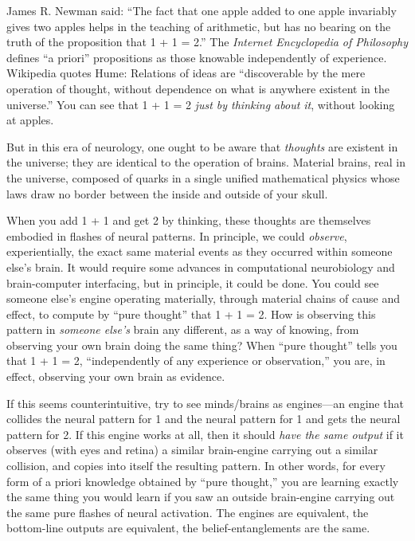 {
 James R. Newman said: ``The fact that one apple
added to one apple invariably gives two apples helps in the teaching of
arithmetic, but has no bearing on the truth of the proposition that 1 +
1 = 2.'' The \textit{Internet Encyclopedia of
Philosophy} defines ``a priori''
propositions as those knowable independently of experience. Wikipedia
quotes Hume: Relations of ideas are ``discoverable by
the mere operation of thought, without dependence on what is anywhere
existent in the universe.'' You can see that 1 + 1 =
2 \textit{just by thinking about it}, without looking at apples.}

{
 But in this era of neurology, one ought to be aware that
\textit{thoughts} are existent in the universe; they are identical to
the operation of brains. Material brains, real in the universe,
composed of quarks in a single unified mathematical physics whose laws
draw no border between the inside and outside of your skull.}

{
 When you add 1 + 1 and get 2 by thinking, these thoughts are
themselves embodied in flashes of neural patterns. In principle, we
could \textit{observe}, experientially, the exact same material events
as they occurred within someone else's brain. It would
require some advances in computational neurobiology and brain-computer
interfacing, but in principle, it could be done. You could see someone
else's engine operating materially, through material
chains of cause and effect, to compute by ``pure
thought'' that 1 + 1 = 2. How is observing this
pattern in \textit{someone else's} brain any different,
as a way of knowing, from observing your own brain doing the same
thing? When ``pure thought'' tells
you that 1 + 1 = 2, ``independently of any experience
or observation,'' you are, in effect, observing your
own brain as evidence.}

{
 If this seems counterintuitive, try to see minds/brains as
engines---an engine that collides the neural pattern for 1 and the
neural pattern for 1 and gets the neural pattern for 2. If this engine
works at all, then it should \textit{have the same output} if it
observes (with eyes and retina) a similar brain-engine carrying out a
similar collision, and copies into itself the resulting pattern. In
other words, for every form of a priori knowledge obtained by
``pure thought,'' you are learning
exactly the same thing you would learn if you saw an outside
brain-engine carrying out the same pure flashes of neural activation.
The engines are equivalent, the bottom-line outputs are equivalent, the
belief-entanglements are the same.}

